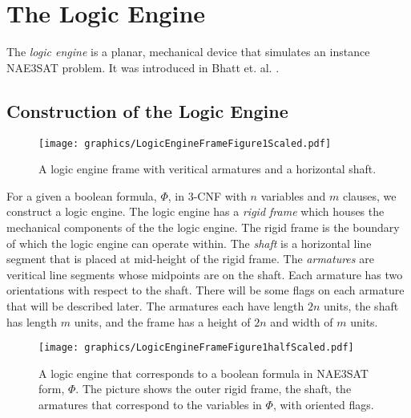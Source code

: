 \documentclass[10pt]{CSUNthesis}
\theoremstyle{plain}%
\theoremstyle{definition}
\theoremstyle{remark}
\begin{document}
\section{The Logic Engine}
The \textit{logic engine} is a planar, mechanical device that simulates an instance NAE3SAT problem. It was introduced in Bhatt et. al. \cite{BC87}.
\subsection{Construction of the Logic Engine}

\begin{figure}[!h]
\begin{center}
\texttt{[image: graphics/LogicEngineFrameFigure1Scaled.pdf]}
\caption{A logic engine frame with veritical armatures and a horizontal shaft.}
\label{fig:LogicEngineFrameFigure1.pdf}
\end{center}
\end{figure}

For a given a boolean formula, $\Phi$, in 3-CNF with $n$ variables and $m$ clauses, we construct a logic engine. The logic engine has a \textit{rigid frame} which houses the mechanical components of the the logic engine.  The rigid frame is the boundary of which the logic engine can operate within.  The \textit{shaft} is a horizontal line segment that is placed at mid-height of the rigid frame. 
The \textit{armatures} are veritical line segments whose midpoints are on the shaft.  
Each armature has two orientations with respect to the shaft. 
There will be some flags on each armature that will be described later.
The armatures each have length $2n$ units, the shaft has length $m$ units, and the frame has a height of $2n$ and width of $m$ units.


\begin{figure}[!h]
\begin{center}
\texttt{[image: graphics/LogicEngineFrameFigure1halfScaled.pdf]}
\caption{A logic engine that corresponds to a boolean formula in NAE3SAT form, $\Phi$.  The picture shows the outer rigid frame, the shaft, the armatures that correspond to the variables in $\Phi$, with oriented flags.}\label{fig:LogicEngineFrameFigure1halfScaled.pdf}
\end{center}
\end{figure}
\end{document}

